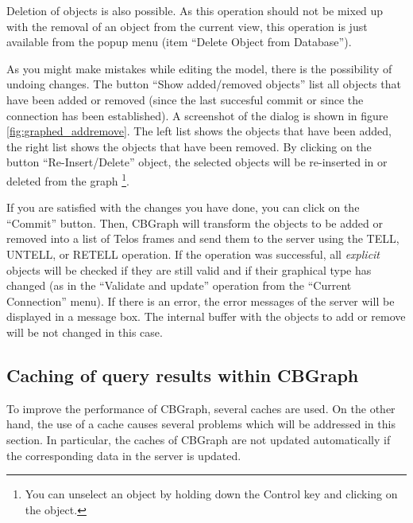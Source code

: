 Deletion of objects is also possible. As this operation should not be mixed up
with the removal of an object from the current view, this operation is just
available from the popup menu (item ``Delete Object from Database'').

As you might make mistakes while editing the model, there is the possibility
of undoing changes. The button ``Show added/removed objects'' list all objects
that have been added or removed (since the last succesful commit or since the connection has been
established). A screenshot of the dialog is shown in figure \ref{fig:graphed_addremove}.
The left list shows the objects that have been added, the right list shows the objects
that have been removed. By clicking on the button ``Re-Insert/Delete'' object, the selected
objects will be re-inserted in or deleted from the graph \footnote{You can unselect an object
by holding down the Control key and clicking on the object.}.


If you are satisfied with the changes you have done, you can click on the
``Commit'' button. Then, CBGraph will transform the objects to be
added or removed into a list of Telos frames and send them to the server
using the TELL, UNTELL, or RETELL operation. If the operation was successful,
all {\em explicit} objects will be checked if they are still valid and if their graphical
type has changed (as in the ``Validate and update'' operation from the ``Current Connection''
menu). If there is an error, the error messages of the server will be displayed
in a message box. The internal buffer with the objects to add or remove will be
not changed in this case.

\subsection{Caching of query results within CBGraph}
\label{sec:graphed_cache}

To improve the performance of CBGraph, several caches
are used. On the other hand, the use of a cache causes
several problems which will be addressed in this section.
In particular, the caches of CBGraph are not
updated automatically if the corresponding data in the
server is updated.

